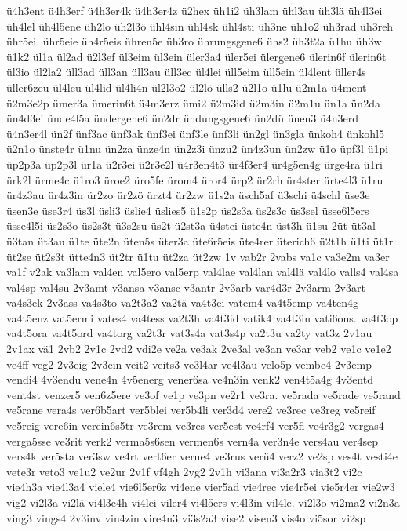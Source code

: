 {ü4h3ent
ü4h3erf
ü4h3er4k
ü4h3er4z
ü2hex
üh1i2
üh3lam
ühl3au
üh3lä
üh4l3ei
üh4lel
üh4l5ene
üh2lo
üh2l3ö
ühl4sin
ühl4sk
ühl4sti
üh3ne
üh1o2
üh3rad
üh3reh
ühr5ei.
ühr5eie
üh4r5eis
ühren5e
üh3ro
ührungsgene6
ühs2
üh3t2a
ü1hu
üh3w
ü1k2
ül1a
ül2ad
ü2l3ef
ül3eim
ül3ein
üler3a4
üler5ei
ülergene6
ülerin6f
ülerin6t
ül3io
ül2la2
üll3ad
üll3an
üll3au
üll3ec
ül4lei
üll5eim
üll5ein
ül4lent
üller4s
üller6zeu
ül4leu
ül4lid
ül4li4n
ül2l3o2
ül2lö
ülls2
ü2l1o
ü1lu
ü2m1a
ü4ment
ü2m3e2p
ümer3a
ümerin6t
ü4m3erz
ümi2
ü2m3id
ü2m3in
ü2m1u
ün1a
ün2da
ün4d3ei
ünde4l5a
ündergene6
ün2dr
ündungsgene6
ün2dü
ünen3
ü4n3erd
ü4n3er4l
ün2f
ünf3ac
ünf3ak
ünf3ei
ünf3le
ünf3li
ün2gl
ün3gla
ünkoh4
ünkohl5
ü2n1o
ünste4r
ü1nu
ün2za
ünze4n
ün2z3i
ünzu2
ün4z3un
ün2zw
ü1o
üpf3l
ü1pi
üp2p3a
üp2p3l
ür1a
ü2r3ei
ü2r3e2l
ü4r3en4t3
ür4f3er4
ür4g5en4g
ürge4ra
ü1ri
ürk2l
ürme4c
ü1ro3
üroe2
üro5fe
ürom4
üror4
ürp2
ür2rh
ür4ster
ürte4l3
ü1ru
ür4z3au
ür4z3in
ür2zo
ür2zö
ürzt4
ür2zw
ü1s2a
üsch5af
ü3schi
ü4schl
üse3e
üsen3e
üse3r4
üs3l
üsli3
üslie4
üslies5
ü1s2p
üs2s3a
üs2s3c
üs3sel
üsse6l5ers
üsse4l5i
üs2s3o
üs2s3t
ü3s2su
üs2t
ü2st3a
ü4stei
üste4n
üst3h
ü1su
2üt
üt3al
ü3tan
üt3au
ü1te
üte2n
üten5s
üter3a
üte6r5eis
üte4rer
üterich6
ü2t1h
ü1ti
üt1r
üt2se
üt2s3t
ütte4n3
üt2tr
ü1tu
üt2za
üt2zw
1v
vab2r
2vabs
va1c
va3e2m
va3er
va1f
v2ak
va3lam
val4en
val5ero
val5erp
val4lae
val4lan
val4lä
val4lo
valls4
val4sa
val4sp
val4su
2v3amt
v3ansa
v3ansc
v3antr
2v3arb
var4d3r
2v3arm
2v3art
va4s3ek
2v3ass
va4s3to
va2t3a2
va2tä
va4t3ei
vatem4
va4t5emp
va4ten4g
va4t5enz
vat5ermi
vates4
va4tess
va2t3h
va4t3id
vatik4
va4t3in
vati6ons.
va4t3op
va4t5ora
va4t5ord
va4torg
va2t3r
vat3s4a
vat3s4p
va2t3u
va2ty
vat3z
2v1au
2v1ax
vä1
2vb2
2v1c
2vd2
vdi2e
ve2a
ve3ak
2ve3al
ve3an
ve3ar
veb2
ve1c
ve1e2
ve4ff
veg2
2v3eig
2v3ein
veit2
veits3
ve3l4ar
ve4l3au
velo5p
vembe4
2v3emp
vendi4
4v3endu
vene4n
4v5energ
vener6sa
ve4n3in
venk2
ven4t5a4g
4v3entd
vent4st
venzer5
ven6z5ere
ve3of
ve1p
ve3pn
ve2r1
ve3ra.
ve5rada
ve5rade
ve5rand
ve5rane
vera4s
ver6b5art
ver5blei
ver5b4li
ver3d4
vere2
ve3rec
ve3reg
ve5reif
ve5reig
vere6in
verein6s5tr
ve3rem
ve3res
ver5est
ve4rf4
ver5fl
ve4r3g2
vergas4
verga5sse
ve3rit
verk2
verma5s6sen
vermen6s
vern4a
ver3n4e
vers4au
ver4sep
vers4k
ver5sta
ver3sw
ve4rt
vert6er
verue4
ve3rus
verü4
verz2
ve2sp
ves4t
vesti4e
vete3r
veto3
ve1u2
ve2ur
2v1f
vf4gh
2vg2
2v1h
vi3ana
vi3a2r3
via3t2
vi2c
vie4h3a
vie4l3a4
viele4
vie6l5er6z
vi4ene
vier5ad
vie4rec
vie4r5ei
vie5r4er
vie2w3
vig2
vi2l3a
vi2lä
vi4l3e4h
vi4lei
viler4
vi4l5ers
vi4l3in
vil4le.
vi2l3o
vi2ma2
vi2n3a
ving3
vings4
2v3inv
vin4zin
vire4n3
vi3s2a3
vise2
visen3
vis4o
vi5sor
vi2sp
}
